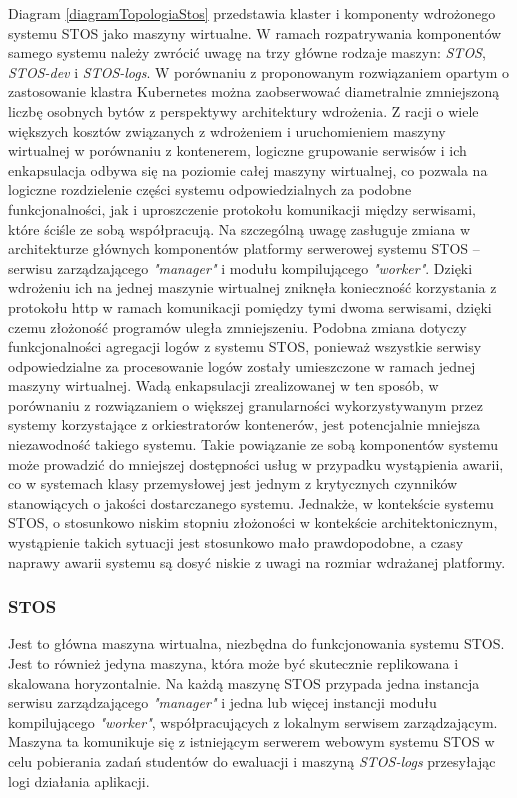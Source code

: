 \noindent Diagram \ref{diagramTopologiaStos} przedstawia klaster i komponenty wdrożonego systemu STOS jako maszyny wirtualne. W ramach rozpatrywania komponentów samego systemu należy zwrócić uwagę na trzy główne rodzaje maszyn: \textit{STOS}, \textit{STOS-dev} i \textit{STOS-logs}. W porównaniu z proponowanym rozwiązaniem opartym o zastosowanie klastra Kubernetes można zaobserwować diametralnie zmniejszoną liczbę osobnych bytów z perspektywy architektury wdrożenia. Z racji o wiele większych kosztów związanych z wdrożeniem i uruchomieniem maszyny wirtualnej w porównaniu z kontenerem, logiczne grupowanie serwisów i ich enkapsulacja odbywa się na poziomie całej maszyny wirtualnej, co pozwala na logiczne rozdzielenie części systemu odpowiedzialnych za podobne funkcjonalności, jak i uproszczenie protokołu komunikacji między serwisami, które ściśle ze sobą współpracują. Na szczególną uwagę zasługuje zmiana w architekturze głównych komponentów platformy serwerowej systemu STOS -- serwisu zarządzającego \textit{"manager"} i modułu kompilującego \textit{"worker"}. Dzięki wdrożeniu ich na jednej maszynie wirtualnej zniknęła konieczność korzystania z protokołu http w ramach komunikacji pomiędzy tymi dwoma serwisami, dzięki czemu złożoność programów uległa zmniejszeniu. Podobna zmiana dotyczy funkcjonalności agregacji logów z systemu STOS, ponieważ wszystkie serwisy odpowiedzialne za procesowanie logów zostały umieszczone w ramach jednej maszyny wirtualnej.
\noindent Wadą enkapsulacji zrealizowanej w ten sposób, w porównaniu z rozwiązaniem o większej granularności wykorzystywanym przez systemy korzystające z orkiestratorów kontenerów, jest potencjalnie mniejsza niezawodność takiego systemu. Takie powiązanie ze sobą komponentów systemu może prowadzić do mniejszej dostępności usług w przypadku wystąpienia awarii, co w systemach klasy przemysłowej jest jednym z krytycznych czynników stanowiących o jakości dostarczanego systemu. Jednakże, w kontekście systemu STOS, o stosunkowo niskim stopniu złożoności w kontekście architektonicznym, wystąpienie takich sytuacji jest stosunkowo mało prawdopodobne, a czasy naprawy awarii systemu są dosyć niskie z uwagi na rozmiar wdrażanej platformy.

\subsubsection{STOS}
Jest to główna maszyna wirtualna, niezbędna do funkcjonowania systemu STOS. Jest to również jedyna maszyna, która może być skutecznie replikowana i skalowana horyzontalnie. Na każdą maszynę STOS przypada jedna instancja serwisu zarządzającego \textit{"manager"} i jedna lub więcej instancji modułu kompilującego \textit{"worker"}, współpracujących z lokalnym serwisem zarządzającym. Maszyna ta komunikuje się z istniejącym serwerem webowym systemu STOS w celu pobierania zadań studentów do ewaluacji i maszyną \textit{STOS-logs} przesyłając logi działania aplikacji.

